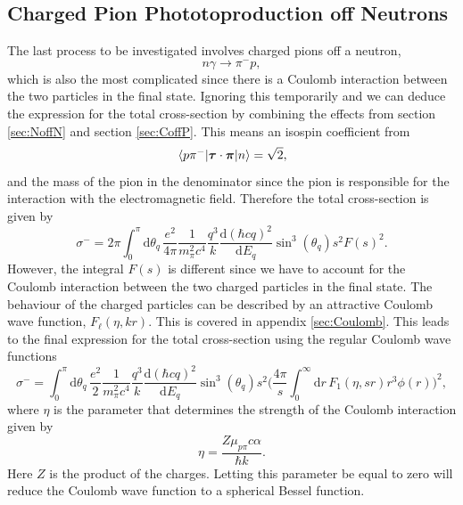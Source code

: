 \subsection{Charged Pion Phototoproduction off Neutrons}
The last process to be investigated involves charged pions off a neutron,
\begin{equation} \label{proc4}
	n\gamma \rightarrow \pi^- p,
\end{equation}
which is also the most complicated since there is a Coulomb interaction between the two particles in the final state. Ignoring this temporarily and we can deduce the expression for the total cross-section by combining the effects from section \ref{sec:NoffN} and section \ref{sec:CoffP}. This means an isospin coefficient from
\begin{equation} \label{isoceffigen}
	\mel*{p\pi^-}{\bm{\mathrm{\tau}}\cdot\bm{\mathrm{\pi}}}{n} = \sqrt{2},
\end{equation}
and the mass of the pion in the denominator since the pion is responsible for the interaction with the electromagnetic field. Therefore the total cross-section is given by
\begin{equation} \label{totcross4}
	\sigma^- =  2\pi \int_0^\pi \text{d}\theta_q \, \frac{e^2}{4\pi}\frac{1}{m_\pi^2c^4}\frac{q^3}{k}\frac{\text{d}(\hbar c q)^2}{\text{d}E_q}\sin^3(\theta_q) s^2 F(s)^2.
\end{equation}
However, the integral $F(s)$ is different since we have to account for the Coulomb interaction between the two charged particles in the final state. The behaviour of the charged particles can be described by an attractive Coulomb	wave function, $F_\ell(\eta, kr)$. This is covered in appendix \ref{sec:Coulomb}. This leads to the final expression for the total cross-section using the regular Coulomb wave functions
\begin{equation} \label{totcross5}
	\sigma^- =  \int_0^\pi \text{d}\theta_q \, \frac{e^2}{2}\frac{1}{m_\pi^2c^4}\frac{q^3}{k}\frac{\text{d}(\hbar c q)^2}{\text{d}E_q}\sin^3(\theta_q) s^2 \bigg(\frac{4\pi}{s} \int_0^\infty \text{d}r \, F_1(\eta,sr)r^3\phi(r)\bigg)^2,
\end{equation}
where $\eta$ is the parameter that determines the strength of the Coulomb interaction given by
\begin{equation} \label{etafunc}
	\eta = \frac{Z\mu_{p\pi}c\alpha}{\hbar k}.
\end{equation}
Here $Z$ is the product of the charges. Letting this parameter be equal to zero will reduce the Coulomb wave function to a spherical Bessel function.